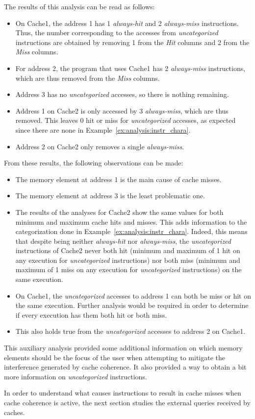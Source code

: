 \begin{example}
The results of this analysis can be read as follows:
\begin{itemize}
\item
   On Cache1, the address 1 has 1 \textit{always-hit} and 2
   \textit{always-miss} instructions. Thus, the number corresponding to the
   accesses from \textit{uncategorized} instructions are obtained by removing
   1 from the \textit{Hit} columns and 2 from the \textit{Miss} columns.
\item
   For address 2, the program that uses Cache1 has 2 \textit{always-miss}
   instructions, which are thus removed from the \textit{Miss} columns.
\item
   Address 3 has no \textit{uncategorized} accesses, so there is nothing
   remaining.
\item
   Address 1 on Cache2 is only accessed by 3 \textit{always-miss}, which are
   thus removed. This leaves 0 hit or miss for \textit{uncategorized} accesses,
   as expected since there are none in  Example~\ref{ex:analysis:instr_chara}.
\item
   Address 2 on Cache2 only removes a single \textit{always-miss}.
\end{itemize}

From these results, the following observations can be made:
\begin{itemize}
\item The memory element at address 1 is the main cause of cache misses.
\item The memory element at address 3 is the least problematic one.
\item
   The results of the analyses for Cache2 show the same values for both minimum
   and maximum cache hits and misses. This adds information to the
   categorization done in Example~\ref{ex:analysis:instr_chara}. Indeed, this
   means that despite being neither \textit{always-hit} nor
   \textit{always-miss}, the \textit{uncategorized} instructions of Cache2
   never both hit (minimum and maximum of 1 hit on any execution for
   \textit{uncategorized} instructions) nor both miss (minimum and maximum of 1
   miss on any execution for \textit{uncategorized} instructions) on the same
   execution.
\item
   On Cache1, the \textit{uncategorized} accesses to address 1 can both be miss
   or hit on the same execution. Further analysis would be required in order to
   determine if every execution has them both hit or both miss.
\item
   This also holds true from the \textit{uncategorized} accesses to address 2
   on Cache1.
\end{itemize}
\end{example}

This auxiliary analysis provided some additional information on which memory
elements should be the focus of the user when attempting to mitigate the
interference generated by cache coherence. It also provided a way to obtain a
bit more information on \textit{uncategorized} instructions.

In order to understand what causes instructions to result in cache misses when
cache coherence is active, the next section studies the external queries
received by caches.

